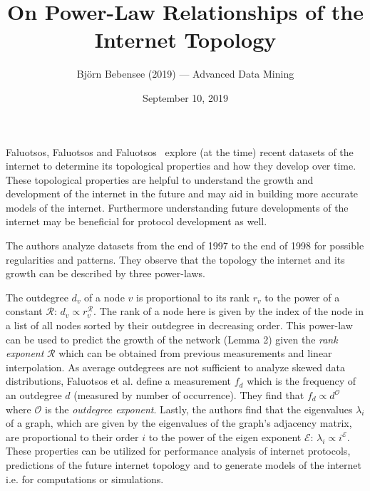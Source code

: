 \documentclass[12pt]{article}
\begin{document}
 
 
\title{On Power-Law Relationships of the Internet Topology}
\author{Bj\"orn Bebensee (2019) --- %
Advanced Data Mining}
\date{September 10, 2019}
\maketitle

Faluotsos, Faluotsos and Faluotsos~\cite{faloutsos} explore (at the time) recent datasets of the internet to determine its topological properties and how they develop over time. These topological properties are helpful to understand the growth and development of the internet in the future and may aid in building more accurate models of the internet. Furthermore understanding future developments of the internet may be beneficial for protocol development as well. 

The authors analyze datasets from the end of 1997 to the end of 1998 for possible regularities and patterns. They observe that the topology the internet and its growth can be described by three power-laws.

The outdegree $d_v$ of a node $v$ is proportional to its rank $r_v$ to the power of a constant $\mathcal{R}$: $d_v \propto r_v^\mathcal{R}$. The rank of a node here is given by the index of the node in a list of all nodes sorted by their outdegree in decreasing order. This power-law can be used to predict the growth of the network (Lemma 2) given the \emph{rank exponent} $\mathcal{R}$ which can be obtained from previous measurements and linear interpolation.
As average outdegrees are not sufficient to analyze skewed data distributions, Faluotsos et al. define a measurement $f_d$ which is the frequency of an outdegree $d$ (measured by number of occurrence). They find that $f_d \propto d^\mathcal{O}$ where $\mathcal{O}$ is the \emph{outdegree exponent}.
Lastly, the authors find that the eigenvalues $\lambda_i$ of a graph, which are given by the eigenvalues of the graph's adjacency matrix, are proportional to their order $i$ to the power of the eigen exponent $\mathcal{E}$: $\lambda_i \propto i^\mathcal{E}$. These properties can be utilized for performance analysis of internet protocols, predictions of the future internet topology and to generate models of the internet i.e. for computations or simulations.
\end{document}
